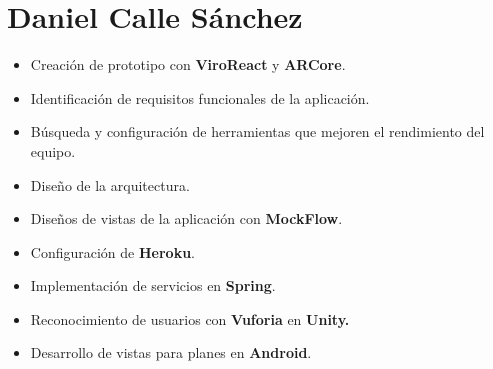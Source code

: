 \section{Daniel Calle Sánchez}
\label{makereference7.2}
\begin{itemize}  
    \item Creación de prototipo con \textbf{ViroReact} y \textbf{ARCore}.
    \item Identificación de requisitos funcionales de la aplicación.
    \item Búsqueda y configuración de herramientas que mejoren el rendimiento del equipo.
    \item Diseño de la arquitectura.
    \item Diseños de vistas de la aplicación con \textbf{MockFlow}.
    \item Configuración de \textbf{Heroku}.
    \item Implementación de servicios en \textbf{Spring}.
    \item Reconocimiento de usuarios con \textbf{Vuforia} en \textbf{Unity.}
    \item Desarrollo de vistas para planes en \textbf{Android}.
\end{itemize}

